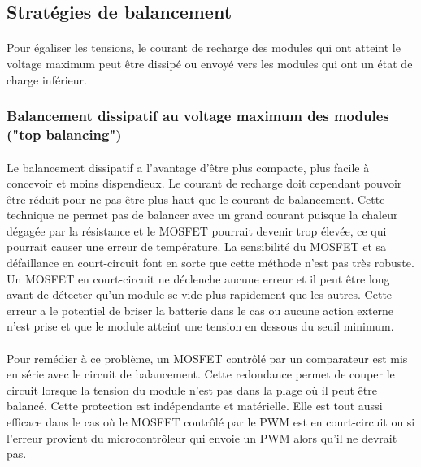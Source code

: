 \subsection*{Stratégies de balancement}
\paragraph*{}
Pour égaliser les tensions, le courant de recharge des modules qui ont atteint le voltage maximum peut être dissipé ou envoyé vers les modules qui ont un état de charge inférieur.

\subsubsection*{Balancement dissipatif au voltage maximum des modules ("top balancing")}
\paragraph*{}
Le balancement dissipatif a l'avantage d'être plus compacte, plus facile à concevoir et moins dispendieux. Le courant de recharge doit cependant pouvoir être réduit pour ne pas être plus haut que le courant de balancement. Cette technique ne permet pas de balancer avec un grand courant puisque la chaleur dégagée par la résistance et le MOSFET pourrait devenir trop élevée, ce qui pourrait causer une erreur de température. La sensibilité du MOSFET et sa défaillance en court-circuit  font en sorte que cette méthode n'est pas très robuste. Un MOSFET en court-circuit ne déclenche aucune erreur et il peut être long avant de détecter qu'un module se vide plus rapidement que les autres. Cette erreur a le potentiel de briser la batterie dans le cas ou aucune action externe n'est prise et que le module atteint une tension en dessous du seuil minimum.

\paragraph*{}
Pour remédier à ce problème, un MOSFET contrôlé par un comparateur est mis en série avec le circuit de balancement. Cette redondance permet de couper le circuit lorsque la tension du module n'est pas dans la plage où il peut être balancé. Cette protection est indépendante et matérielle. Elle est tout aussi efficace dans le cas où le MOSFET contrôlé par le PWM est en court-circuit ou si l'erreur provient du microcontrôleur qui envoie un PWM alors qu'il ne devrait pas.

